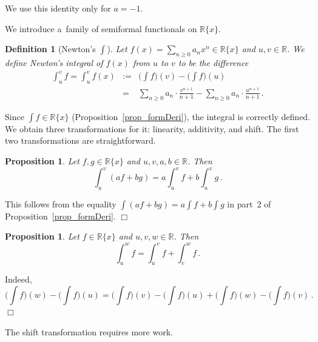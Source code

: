 \documentclass[10pt]{article}
\def\R{\mathbb{R}}
\def\proof{\par\noindent{\em Proof. }}
\def\eproof{\hfill{$\Box$}\bigskip}
\newtheorem{prop}[thm]{Proposition}
\newtheorem{defi}[thm]{Definition}
\begin{document}
\noindent
We use this identity only for $a=-1$.

We introduce a~family of semiformal functionals on 
$\R\{x\}$. 

\begin{defi}[Newton's $\int$]\label{def_NewtonInt}
Let $f(x)=\sum_{n\ge0}a_nx^n\in 
\R\{x\}$ and $u,v\in\R$. We define Newton's integral of 
$f(x)$ from $u$ to $v$ to be the difference
\begin{eqnarray*}
{\textstyle
\int_u^v f=\int_u^v f(x)}&:=&
{\textstyle\big(\int f\big)(v)-
\big(\int f\big)(u)
}\\&=&{\textstyle
\sum_{n\ge0}a_n\cdot\frac{v^{n+1}}{n+1}-\sum_{n\ge0}a_n\cdot\frac{u^{n+1}}{n+1}\,.
}
\end{eqnarray*}
\end{defi}
Since 
$\int f\in\R\{x\}$ (Proposition~\ref{prop_formDeri}), the integral is correctly defined. We obtain three transformations for it: linearity, additivity, and shift. The first two transformations are 
straightforward. 

\begin{prop}\label{prop_lineInte3}
Let $f,g\in\R\{x\}$ and $u,v,a,b\in\R$. Then
$${\textstyle
\int_u^v(af+bg)=a\int_u^v f
+b\int_u^v g\,.
}
$$
\end{prop}
\proof
This follows from the equality $\int(af+bg)=a\int f+b\int g$ in part~2 of Proposition~\ref{prop_formDeri}. 
\eproof

\begin{prop}\label{prop_addiInte3}
Let $f\in\R\{x\}$ and $u,v,w\in\R$. Then 
$${\textstyle
\int_u^w f=\int_u^v f+\int_v^w f\,.
}
$$
\end{prop}
\proof
Indeed, 
$$
{\textstyle
\big(\int f\big)(w)-\big(\int f\big)(u)=\big(\int f\big)(v)-\big(\int f\big)(u)+\big(\int f\big)(w)-\big(\int f\big)(v)\,. 
}
$$
\eproof

The shift transformation requires more work. 
\end{document}
